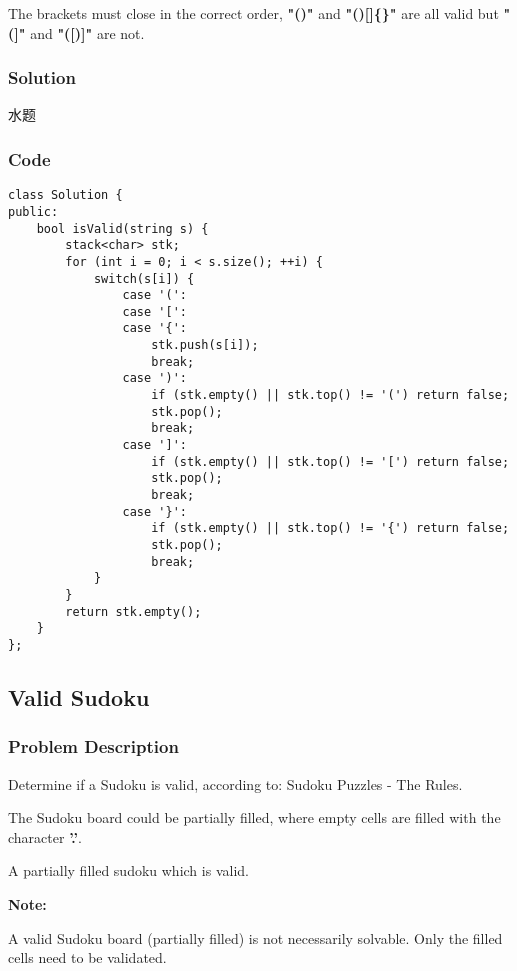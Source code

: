 \documentclass[courier]{article}
\begin{document}
\begin{CJK*}{UTF8}{gkai}
The brackets must close in the correct order, \textbf{"()"} and \textbf{"()[]\{\}"} are all valid but \textbf{"(]"} and \textbf{"([)]"} are not.



\subsubsection*{Solution}
水题

\subsubsection*{Code}
\begin{lstlisting}
class Solution {
public:
    bool isValid(string s) {
        stack<char> stk;
        for (int i = 0; i < s.size(); ++i) {
            switch(s[i]) {
                case '(':
                case '[':
                case '{':
                    stk.push(s[i]);
                    break;
                case ')':
                    if (stk.empty() || stk.top() != '(') return false;
                    stk.pop();
                    break;
                case ']':
                    if (stk.empty() || stk.top() != '[') return false;
                    stk.pop();
                    break;
                case '}':
                    if (stk.empty() || stk.top() != '{') return false;
                    stk.pop();
                    break;
            }
        }
        return stk.empty();
    }
}; 
\end{lstlisting}


\subsection{ Valid Sudoku }

\subsubsection*{Problem Description}
Determine if a Sudoku is valid, according to: Sudoku Puzzles - The Rules.

The Sudoku board could be partially filled, where empty cells are filled with the character \textbf{'.'}.

A partially filled sudoku which is valid.

\textbf{Note:}


A valid Sudoku board (partially filled) is not necessarily solvable. Only the filled cells need to be validated.




\end{CJK*}
\end{document}
